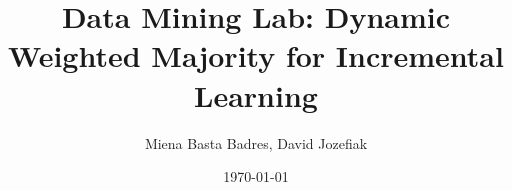\documentclass[t]{beamer}
\title{Data Mining Lab: Dynamic Weighted Majority for Incremental Learning}
\date{\today}
\author{Miena Basta Badres, David Jozefiak}
\begin{document}



\begin{frame}
\titlepage
\end{frame}





\end{document}
